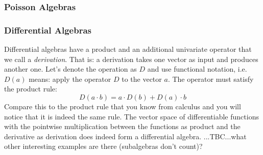 \subsubsection{Poisson Algebras} 


\subsubsection{Differential Algebras} 
Differential algebras have a product and an additional univariate operator that we call a \emph{derivation}. That is: a derivation takes one vector as input and produces another one. Let's denote the operation as $D$ and use functional notation, i.e. $D(a)$ means: apply the operator $D$ to the vector $a$. The operator must satisfy the product rule:
\begin{equation}
 D(a \cdot b) = a \cdot D(b) + D(a) \cdot b
\end{equation}
Compare this to the product rule that you know from calculus and you will notice that it is indeed the same rule. The vector space of differentiable functions with the pointwise multiplication between the functions as product and the derivative as derivation does indeed form a differential algebra. ...TBC...what other interesting examples are there (subalgebras don't count)?








